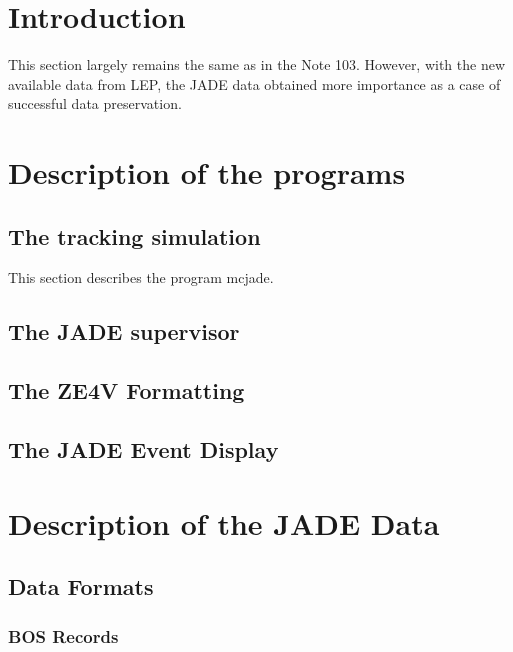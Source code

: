 

\section{Introduction}

This section largely remains the same as in the Note 103.
However, with the new available data from LEP, the JADE data 
obtained more importance as a case of successful data preservation.




\section{Description of the programs}



\subsection{The tracking simulation}
This section describes the program  mcjade.



\subsection{The JADE supervisor}




\subsection{The ZE4V Formatting}



\subsection{The JADE Event Display}


\section{Description of the JADE Data}


\subsection{Data Formats}


\subsubsection{BOS Records}


